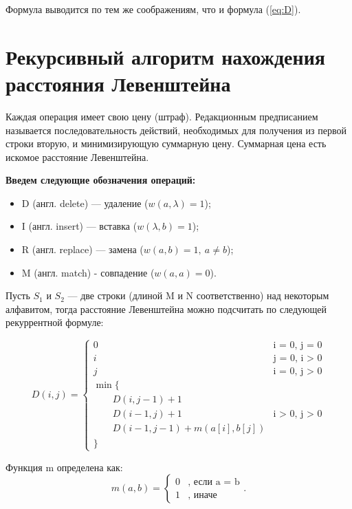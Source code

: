 Формула выводится по тем же соображениям, что и формула (\ref{eq:D}).


\section{Рекурсивный алгоритм нахождения расстояния Левенштейна}

Каждая операция имеет свою цену (штраф). Редакционным предписанием называется последовательность действий, необходимых для получения из первой строки вторую, и минимизирующую суммарную цену. Суммарная цена есть искомое расстояние Левенштейна.

\textbf{Введем следующие обозначения операций:} 
\begin{itemize}
	\item D (англ. delete) — удаление ($w(a,\lambda)=1$);
	\item I (англ. insert) — вставка ($w(\lambda,b)=1$);
	\item R (англ. replace) — замена  ($w(a,b)=1, \medspace a \neq b$);
	\item M (англ. match) - совпадение ($w(a,a)=0$).
\end{itemize}

Пусть $S_{1}$ и $S_{2}$ — две строки (длиной M и N соответственно) над некоторым алфавитом, тогда расстояние Левенштейна можно подсчитать по следующей рекуррентной формуле:

\begin{equation}
	\label{eq:D}
	D(i, j) = \begin{cases}
		0 &\text{i = 0, j = 0}\\
		i &\text{j = 0, i > 0}\\
		j &\text{i = 0, j > 0}\\
		\min \lbrace \\
		\qquad D(i, j-1) + 1\\
		\qquad D(i-1, j) + 1 &\text{i > 0, j > 0}\\
		\qquad D(i-1, j-1) + m(a[i], b[j]) \\
		\rbrace
	\end{cases}
\end{equation}

Функция m определена как:
\begin{equation}
	\label{eq:m}
	m(a, b) = \begin{cases}
		0 &\text{, если a = b}\\
		1 &\text{, иначе}
	\end{cases}.
\end{equation}

